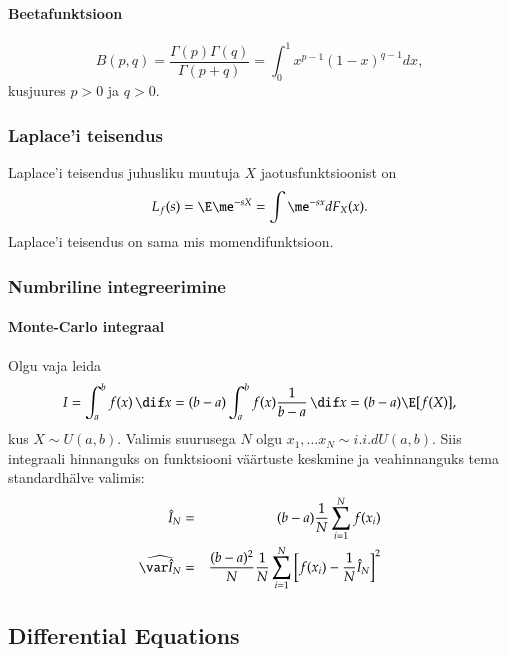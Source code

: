 \documentclass[a4paper]{article}
\numberwithin{equation}{subsection}
\begin{document}
\paragraph{Beetafunktsioon}
\begin{equation}
B(p,q) = \frac{\Gamma(p) \Gamma(q)}{\Gamma(p+q)} =
  \int_0^1 x^{p-1} (1-x)^{q-1} dx,
\end{equation}
kusjuures $p>0$ ja $q>0$.


\subsubsection{Laplace'i teisendus}
Laplace'i teisendus juhusliku muutuja $X$ jaotusfunktsioonist on
\begin{equation}
L_f (s) = \E \me^{-sX} = 
  \int \me^{-sx} dF_X (x).
\end{equation}
Laplace'i teisendus on sama mis momendifunktsioon.


\subsubsection{Numbriline integreerimine}

\paragraph{Monte-Carlo integraal}

Olgu vaja leida
\begin{equation}
  I = \int_a^b f(x)\, \dif x =
  (b - a) \int_a^b f(x) \frac{1}{b - a}\, \dif x =
  (b - a) \E [f(X)],
\end{equation}
kus $X \sim U(a, b)$.  Valimis suurusega $N$ olgu $x_1, \ldots x_N
\sim i.i.d U(a, b)$.  Siis integraali hinnanguks on funktsiooni
väärtuste keskmine ja veahinnanguks tema standardhälve valimis:
\begin{eqnarray}
  \hat I_N &=& (b - a) \frac{1}{N} \sum_{i=1}^N f(x_i)\\
  \widehat{\var \hat I_N} &=&
  \frac{(b - a)^2}{N} \frac{1}{N} \sum_{i=1}^N 
  \left[f(x_i) - \frac{1}{N} \hat I_N \right]^2
\end{eqnarray}



\clearpage

\subsection{Differential Equations}
\label{sec:differential_equations}
\end{document}
